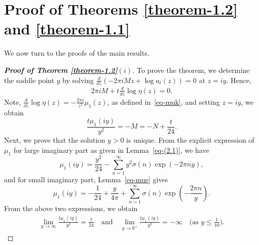 \documentclass[10pt,a4paper]{amsart}
\numberwithin{equation}{section}
\begin{document}
	\section{Proof of Theorems \ref{theorem-1.2} and \ref{theorem-1.1}}
	We now turn to the proofs of the main results. 

	\begin{proof}[\textbf{\boldmath Proof of Theorem \ref{theorem-1.2}$(i)$}]
		To prove the theorem, we determine the saddle point $y$ by solving $\frac{d}{dz}\left(-2\pi iMz+\log a_t(z)\right)=0$ at $z=iy.$ Hence,
		\begin{align*}%
			2\pi iM+t\frac{d}{dz}\log \eta(z)=0.  
		\end{align*}
		Note, $\frac{d}{dz}\log \eta(z)=-\frac{2\pi i}{z^{2}}\mu_1(z)$, as defined in~\eqref{eq-muk}, and setting $z=iy$, we obtain
		\begin{equation*}%
			\frac{t\mu_{1}(iy)}{y^{2}}=-M=-N+\frac{t}{24}.   
		\end{equation*}
		Next, we prove that the solution $y>0$ is unique. From the explicit expression of $\mu_1$ for large imaginary part as given in Lemma~\ref{eq-(2.1)}, we have 
		\begin{equation*}%
			\mu_{1}(iy)=\frac{y^{2}}{24}-\sum_{n=1}^{\infty}y^{2}\sigma(n)\exp(-2\pi ny), 
		\end{equation*} 
		and for small imaginary part, Lemma~\ref{eq-mue} gives
		\begin{equation}\label{eq-pf12}
			\mu_{1}(iy)=-\frac{1}{24}+\frac{y}{4\pi}+\sum_{n=1}^{\infty}\sigma(n)\exp\left(-\frac{2\pi n}{y}\right).
		\end{equation}
		From the above two expressions, we obtain 
		\begin{align*}
			\lim_{y\to\infty}\frac{t\mu_1(iy)}{y^{2}}=\frac{t}{24} \quad\text{and}\quad \lim_{y\to 0^{+}}\frac{t\mu_1(iy)}{y^{2}}=-\infty \quad\text{(as $y\le \frac{1}{10}$)}.

\end{align*}
\end{proof}
\end{document}
